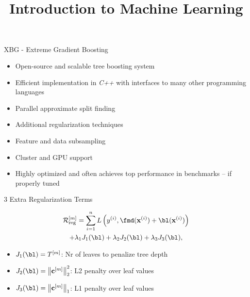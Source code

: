 \documentclass[11pt,compress,t,notes=noshow, xcolor=table]{beamer}
\title{Introduction to Machine Learning}
\begin{document}


\begin{vbframe}{XBG - Extreme Gradient Boosting}



  \begin{itemize}
    \item Open-source and scalable tree boosting system
    \item Efficient implementation in \emph{C++} with interfaces to many other programming languages
    \item Parallel approximate split finding
    \item Additional regularization techniques
    \item Feature and data subsampling
    \item Cluster and GPU support
    \item Highly optimized and often achieves top performance in benchmarks 
        -- if properly tuned
  \end{itemize}

\end{vbframe}

\begin{frame}{3 Extra Regularization Terms}


  \begin{multline*}
    \riskr^{[m]} = \sum_{i=1}^{n} L\left(\yi, \fmd(\xi) + \bl(\xi)\right)\\
    + \lambda_1 J_1(\bl) + \lambda_2 J_2(\bl) + \lambda_3 J_3(\bl),
  \end{multline*}

  \lz
  \begin{itemize}
    \item $J_1(\bl) = T^{[m]}$:  Nr of leaves to penalize tree depth
    \item $J_2(\bl) = \left\|\mathbf{c}^{[m]}\right\|^2_2$:  L2 penalty over leaf values 
    \item $J_3(\bl) = \left\|\mathbf{c}^{[m]}\right\|_1$: L1 penalty over leaf values 
  \end{itemize}
\end{frame}
\end{document}
